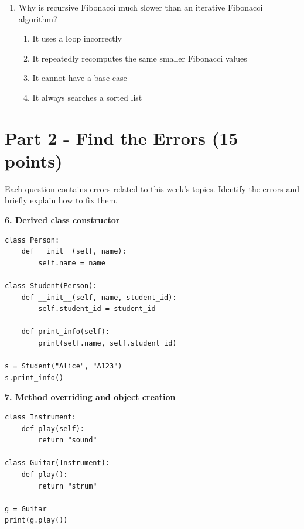 \documentclass[11pt]{article}
\newcommand{\code}[1]{\texttt{\detokenize{#1}}}
\begin{document}
\begin{enumerate}[label=\arabic*.]
What is printed?
    \begin{enumerate}[label=\alph*)]
        \item \code{...}
        \item \code{meow}
        \item \code{Cat}
        \item An error occurs because \code{speak()} is defined twice
    \end{enumerate}

    \item Why is recursive Fibonacci much slower than an iterative Fibonacci algorithm?
    \begin{enumerate}[label=\alph*)]
        \item It uses a loop incorrectly
        \item It repeatedly recomputes the same smaller Fibonacci values
        \item It cannot have a base case
        \item It always searches a sorted list
    \end{enumerate}
\end{enumerate}

\newpage

\section*{Part 2 - Find the Errors (15 points)}

Each question contains errors related to this week's topics. Identify the errors and briefly explain how to fix them.

\textbf{6. Derived class constructor}

\begin{verbatim}
class Person:
    def __init__(self, name):
        self.name = name

class Student(Person):
    def __init__(self, name, student_id):
        self.student_id = student_id

    def print_info(self):
        print(self.name, self.student_id)

s = Student("Alice", "A123")
s.print_info()
\end{verbatim}

\vspace{2.3in}

\textbf{7. Method overriding and object creation}

\begin{verbatim}
class Instrument:
    def play(self):
        return "sound"

class Guitar(Instrument):
    def play():
        return "strum"

g = Guitar
print(g.play())
\end{verbatim}
\end{document}
